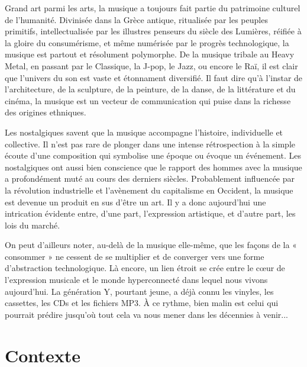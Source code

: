 \documentclass[a4paper,12pt]{article}
\begin{document}
Grand art parmi les arts, la musique a toujours fait partie du patrimoine culturel de l'humanité. Divinisée dans la Grèce antique, ritualisée par les peuples primitifs, intellectualisée par les illustres penseurs du siècle des Lumières, réifiée à la gloire du consumérisme, et même numérisée par le progrès technologique, la musique est partout et résolument polymorphe. De la musique tribale au Heavy Metal, en passant par le Classique, la J-pop, le Jazz, ou encore le Raï, il est clair que l'univers du son est vaste et étonnament diversifié. Il faut dire qu'à l'instar de l'architecture, de la sculpture, de la peinture, de la danse, de la littérature et du cinéma, la musique est un vecteur de communication qui puise dans la richesse des origines ethniques.

Les nostalgiques savent que la musique accompagne l'histoire, individuelle et collective. Il n'est pas rare de plonger dans une intense rétrospection à la simple écoute d'une composition qui symbolise une époque ou évoque un événement. Les nostalgiques ont aussi bien conscience que le rapport des hommes avec la musique a profondément muté au cours des derniers siècles. Probablement influencée par la révolution industrielle et l'avènement du capitalisme en Occident, la musique est devenue un produit en sus d'être un art. Il y a donc aujourd'hui une intrication évidente entre, d'une part, l'expression artistique, et d'autre part, les lois du marché.

On peut d'ailleurs noter, au-delà de la musique elle-même, que les façons de la « consommer » ne cessent de se multiplier et de converger vers une forme d'abstraction technologique. Là encore, un lien étroit se crée entre le cœur de l'expression musicale et le monde hyperconnecté dans lequel nous vivons aujourd'hui. La génération Y, pourtant jeune, a déjà connu les vinyles, les cassettes, les CDs et les fichiers MP3. À ce rythme, bien malin est celui qui pourrait prédire jusqu'où tout cela va nous mener dans les décennies à venir...

\newpage


\part{Contexte}
\end{document}
